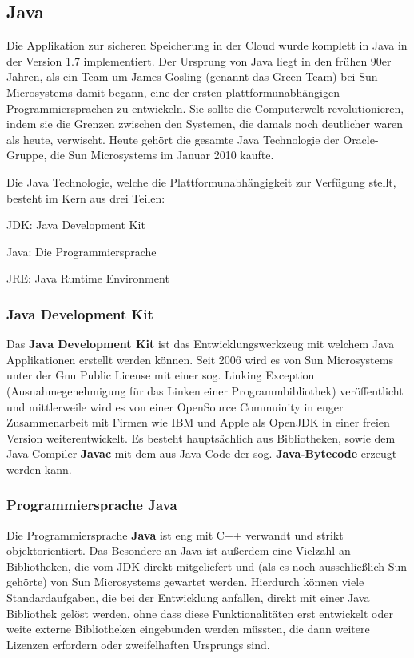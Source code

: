 \documentclass[13pt,a4paper,bibliography=totocnumbered,listof=totocnumbered]{scrartcl}
\begin{document}
\subsection{Java}\label{JavaV}
Die Applikation zur sicheren Speicherung in der Cloud wurde komplett in Java in der Version 1.7 implementiert. Der Ursprung von Java liegt in den frühen 90er Jahren, als ein Team um James Gosling (genannt das Green Team) bei Sun Microsystems damit begann, eine der ersten plattformunabhängigen Programmiersprachen zu entwickeln. Sie sollte die Computerwelt revolutionieren, indem sie die Grenzen zwischen den Systemen, die damals noch deutlicher waren als heute, verwischt. Heute gehört die gesamte Java Technologie der Oracle-Gruppe, die Sun Microsystems im Januar 2010 kaufte.\\
\cite{1}\cite{2}\cite[S. 52]{3}

Die Java Technologie, welche die Plattformunabhängigkeit zur Verfügung stellt, besteht im Kern aus drei Teilen:
\begin{compactitem}
	\item JDK: Java Development Kit
	\item Java: Die Programmiersprache
	\item JRE: Java Runtime Environment
\end{compactitem}

\subsubsection{Java Development Kit}
Das \textbf{Java Development Kit} ist das Entwicklungswerkzeug mit welchem Java Applikationen erstellt werden können. Seit 2006 wird es von Sun Microsystems unter der Gnu Public License mit einer sog. Linking Exception (Ausnahmegenehmigung für das Linken einer Programmbibliothek) veröffentlicht und mittlerweile wird es von einer OpenSource Commuinity in enger Zusammenarbeit mit Firmen wie IBM und Apple als OpenJDK in einer freien Version weiterentwickelt. Es besteht hauptsächlich aus Bibliotheken, sowie dem Java Compiler \textbf{Javac} mit dem aus Java Code der sog. \textbf{Java-Bytecode} erzeugt werden kann.\\
\cite[S. 63f]{3}

\subsubsection{Programmiersprache Java}
Die Programmiersprache \textbf{Java} ist eng mit C++ verwandt und strikt objektorientiert. Das Besondere an Java ist außerdem eine Vielzahl an Bibliotheken, die vom JDK direkt mitgeliefert und (als es noch ausschließlich Sun gehörte) von Sun Microsystems gewartet werden. Hierdurch können viele Standardaufgaben, die bei der Entwicklung anfallen, direkt mit einer Java Bibliothek gelöst werden, ohne dass diese Funktionalitäten erst entwickelt oder weite externe Bibliotheken eingebunden werden müssten, die dann weitere Lizenzen erfordern oder zweifelhaften Ursprungs sind.\\
\cite[S. 55, 60]{3}
\end{document}
